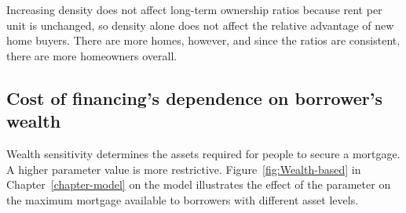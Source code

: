 Increasing density does not affect long-term ownership ratios because rent per unit is unchanged, so density alone does not affect the relative advantage of new home buyers. %
There are more homes, however, and since the ratios are consistent, there are more homeowners overall. %

\newpage

\subsection{Cost of financing's dependence on borrower's wealth}

Wealth sensitivity %
determines the assets required for people to secure a mortgage. A higher parameter value is more restrictive. Figure~\ref{fig:Wealth-based} in Chapter~\ref{chapter-model} on the model illustrates the effect of the parameter on the maximum mortgage available to borrowers with different asset levels. %

